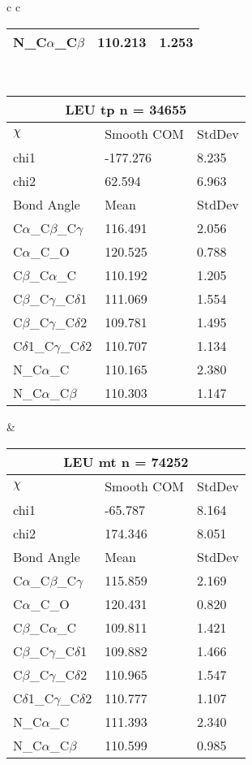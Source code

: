 \begin{longtable}{ c c }
\begin{tabular}{ l l l }
  N\_C$\alpha$\_C$\beta$ & 110.213 & 1.253\\
  \bottomrule
  \end{tabular}
  \\
  \begin{tabular}{ l l l }
  \toprule
  \multicolumn{3}{c}{LEU \textbf{tp} n = 34655} \\ \toprule
  $\chi$       & Smooth COM & StdDev \\ \midrule
  chi1 & -177.276 & 8.235 \\ 
  chi2 & 62.594 & 6.963 \\ \midrule
  Bond Angle   & Mean     & StdDev \\ \midrule
  C$\alpha$\_C$\beta$\_C$\gamma$ & 116.491 & 2.056\\
  C$\alpha$\_C\_O & 120.525 & 0.788\\
  C$\beta$\_C$\alpha$\_C & 110.192 & 1.205\\
  C$\beta$\_C$\gamma$\_C$\delta$1 & 111.069 & 1.554\\
  C$\beta$\_C$\gamma$\_C$\delta$2 & 109.781 & 1.495\\
  C$\delta$1\_C$\gamma$\_C$\delta$2 & 110.707 & 1.134\\
  N\_C$\alpha$\_C & 110.165 & 2.380\\
  N\_C$\alpha$\_C$\beta$ & 110.303 & 1.147\\
  \bottomrule
  \end{tabular}
  &
  \begin{tabular}{ l l l }
  \toprule
  \multicolumn{3}{c}{LEU \textbf{mt} n = 74252} \\ \toprule
  $\chi$       & Smooth COM & StdDev \\ \midrule
  chi1 & -65.787 & 8.164 \\ 
  chi2 & 174.346 & 8.051 \\ \midrule
  Bond Angle   & Mean     & StdDev \\ \midrule
  C$\alpha$\_C$\beta$\_C$\gamma$ & 115.859 & 2.169\\
  C$\alpha$\_C\_O & 120.431 & 0.820\\
  C$\beta$\_C$\alpha$\_C & 109.811 & 1.421\\
  C$\beta$\_C$\gamma$\_C$\delta$1 & 109.882 & 1.466\\
  C$\beta$\_C$\gamma$\_C$\delta$2 & 110.965 & 1.547\\
  C$\delta$1\_C$\gamma$\_C$\delta$2 & 110.777 & 1.107\\
  N\_C$\alpha$\_C & 111.393 & 2.340\\
  N\_C$\alpha$\_C$\beta$ & 110.599 & 0.985\\

\end{tabular}
\end{longtable}
